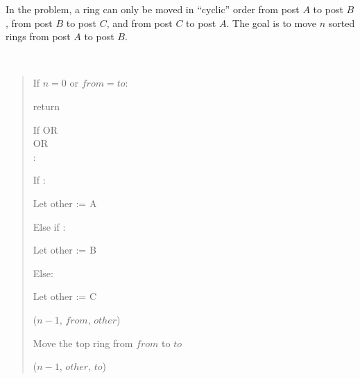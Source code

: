 \documentclass[10pt]{article}
\begin{document}
In the  problem, a ring can only be moved in ``cyclic'' order from post \( A \) to post \( B \), from post \( B \) to post \( C \), and from post \( C \) to post \( A \). The goal is to move \( n \) sorted rings from post \( A \) to post \( B \).

\begin{solution}\ %
\begin{quote}
\noindent{}%

%
\begin{steps}
  \item If \( n = 0 \) or \( from = to \):
    \begin{steps}
    \item return
    \end{steps}

  \item If \big[\( (from = A) \) AND \( (to = B) \)\big] OR \\
    \nf{\quad}\big[\( (from = B) \) AND \( (to = C) \)\big] OR \\
    \nf{\quad}\big[\( (from = C) \) AND \( (to = A) \)\big]: 
     \begin{steps}
      \item If :
        \begin{steps}
        \item Let other := A
        \end{steps}
      \item Else if :
        \begin{steps}
        \item Let other := B
        \end{steps}
      \item Else:
        \begin{steps}
        \item Let other := C
        \end{steps}
      \item {}(\( n - 1 \), \( from \), \( other \))
      \item Move the top ring from \( from \) to \( to \)
      \item {}(\( n - 1 \), \( other \), \( to \))
      \end{steps}


\end{steps}
\end{quote}
\end{solution}
\end{document}
